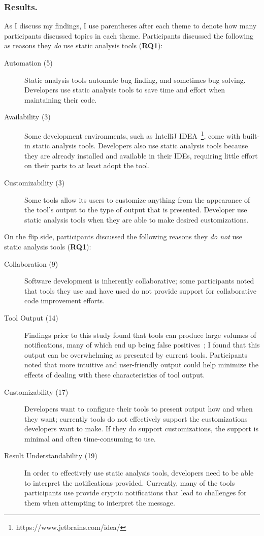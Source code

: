 \documentclass{llncs}
\begin{document}
\subsubsection{Results.} As I discuss my findings, I use parentheses after each theme to denote how many participants discussed topics in each theme. 
Participants discussed the following as reasons they \emph{do} use static analysis tools (\textbf{RQ1}): 
\begin{description}
	\item[Automation (5)] Static analysis tools automate bug finding, and sometimes bug solving. Developers use static analysis tools to save time and effort when maintaining their code.
	\item[Availability (3)] Some development environments, such as IntelliJ IDEA~\footnote{https://www.jetbrains.com/idea/}, come with built-in static analysis tools. Developers also use static analysis tools because they are already installed and available in their IDEs, requiring little effort on their parts to at least adopt the tool.
	\item[Customizability (3)] Some tools allow its users to customize anything from the appearance of the tool's output to the type of output that is presented. Developer use static analysis tools when they are able to make desired customizations.
\end{description}

On the flip side, participants discussed the following reasons they \emph{do not} use static analysis tools (\textbf{RQ1}): 
\begin{description}
		\item [Collaboration (9)] Software development is inherently collaborative; some participants noted that tools they use and have used do not provide support for collaborative code improvement efforts.
		\item [Tool Output (14)] Findings prior to this study found that tools can produce large volumes of notifications, many of which end up being false positives~\cite{Ayewah:2010:GFF,Shen:2011:EFindBugs}; I found that this output can be overwhelming as presented by current tools. Participants noted that more intuitive and user-friendly output could help minimize the effects of dealing with these characteristics of tool output.
		\item [Customizability (17)] Developers want to configure their tools to present output how and when they want; currently tools do not effectively support the customizations developers want to make. If they do support customizations, the support is minimal and often time-consuming to use.
		\item [Result Understandability (19)] In order to effectively use static analysis tools, developers need to be able to interpret the notifications provided. Currently, many of the tools participants use provide cryptic notifications that lead to challenges for them when attempting to interpret the message.
\end{description}
\end{document}
